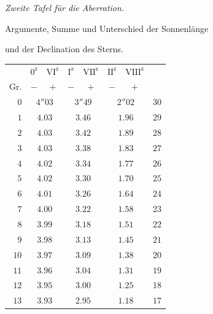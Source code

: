 \begin{center}
\textit{Zweite Tafel für die Aberration.}\par\medskip
Argumente, Summe und Unterschied der Sonnenlänge\par
und der Declination des Sterns.\par\medskip
\begingroup\small\setlength{\tabcolsep}{8pt}
\begin{tabular}{r||cc|cc|cc||r}
&$0^{\mathrm z}$&$\mathrm{VI}^{\mathrm z}$&$\mathrm I^{\mathrm z}$&$\mathrm{VII}^{\mathrm z}$&$\mathrm{II}^{\mathrm z}$&$\mathrm{VIII}^{\mathrm z}$&\\
Gr.&$-$&$+$&$-$&$+$&$-$&$+$&\\\hline
$0$&\multicolumn{2}{c|}{$4''03$}&\multicolumn{2}{c|}{$3''49$}&\multicolumn{2}{c||}{$2''02$}&$30$\\
$1$&\multicolumn{2}{c|}{$4.03$}&\multicolumn{2}{c|}{$3.46$}&\multicolumn{2}{c||}{$1.96$}&$29$\\
$2$&\multicolumn{2}{c|}{$4.03$}&\multicolumn{2}{c|}{$3.42$}&\multicolumn{2}{c||}{$1.89$}&$28$\\
$3$&\multicolumn{2}{c|}{$4.03$}&\multicolumn{2}{c|}{$3.38$}&\multicolumn{2}{c||}{$1.83$}&$27$\\
$4$&\multicolumn{2}{c|}{$4.02$}&\multicolumn{2}{c|}{$3.34$}&\multicolumn{2}{c||}{$1.77$}&$26$\\
$5$&\multicolumn{2}{c|}{$4.02$}&\multicolumn{2}{c|}{$3.30$}&\multicolumn{2}{c||}{$1.70$}&$25$\\[3pt]
$6$&\multicolumn{2}{c|}{$4.01$}&\multicolumn{2}{c|}{$3.26$}&\multicolumn{2}{c||}{$1.64$}&$24$\\
$7$&\multicolumn{2}{c|}{$4.00$}&\multicolumn{2}{c|}{$3.22$}&\multicolumn{2}{c||}{$1.58$}&$23$\\
$8$&\multicolumn{2}{c|}{$3.99$}&\multicolumn{2}{c|}{$3.18$}&\multicolumn{2}{c||}{$1.51$}&$22$\\
$9$&\multicolumn{2}{c|}{$3.98$}&\multicolumn{2}{c|}{$3.13$}&\multicolumn{2}{c||}{$1.45$}&$21$\\
$10$&\multicolumn{2}{c|}{$3.97$}&\multicolumn{2}{c|}{$3.09$}&\multicolumn{2}{c||}{$1.38$}&$20$\\[3pt]
$11$&\multicolumn{2}{c|}{$3.96$}&\multicolumn{2}{c|}{$3.04$}&\multicolumn{2}{c||}{$1.31$}&$19$\\
$12$&\multicolumn{2}{c|}{$3.95$}&\multicolumn{2}{c|}{$3.00$}&\multicolumn{2}{c||}{$1.25$}&$18$\\
$13$&\multicolumn{2}{c|}{$3.93$}&\multicolumn{2}{c|}{$2.95$}&\multicolumn{2}{c||}{$1.18$}&$17$\\

\end{tabular}
\end{center}
